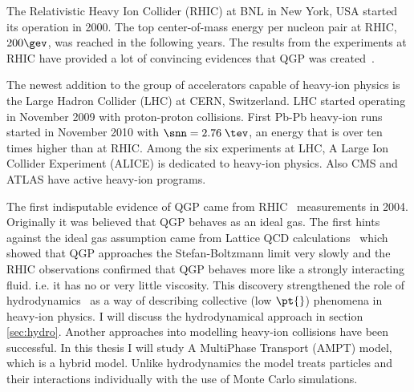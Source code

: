 The Relativistic Heavy Ion Collider (RHIC) at BNL in New York, USA started its  operation in 2000. The top center-of-mass energy per nucleon pair at RHIC, $200 \gev$, was reached in the following years. The results from the experiments at RHIC have provided a lot of convincing evidences that QGP was created~\cite{Adcox:2004mh, Adams:2005dq, Arsene:2004fa, Back:2004je}. 

The newest addition to the group of accelerators capable of heavy-ion physics is the Large Hadron Collider (LHC) at CERN, Switzerland. LHC started operating in November 2009 with proton-proton collisions. First Pb-Pb heavy-ion runs started in November 2010 with $\snn=2.76\; \tev$, an energy that is over ten times higher than at RHIC. Among the six experiments at LHC, A Large Ion Collider Experiment (ALICE) is dedicated to heavy-ion physics. Also CMS and ATLAS have active heavy-ion programs. 

The first indisputable evidence of QGP came from RHIC~\cite{Adcox:2004mh} measurements in 2004. Originally it was believed that QGP behaves as an ideal gas. The first hints against the ideal gas assumption came from Lattice QCD calculations~\cite{Karsch:2001cy} which showed that QGP approaches the Stefan-Boltzmann limit very slowly and the RHIC observations confirmed that QGP behaves more like a strongly interacting fluid. i.e. it has no or very little viscosity. This discovery strengthened the role of hydrodynamics~\cite{PhysRevD.27.140, Baym1983541, PhysRevD.34.794} as a way of describing collective (low $\pt{}$) phenomena in heavy-ion physics. I will discuss the hydrodynamical approach in section \ref{sec:hydro}. Another approaches into modelling heavy-ion collisions have been successful. In this thesis I will study A MultiPhase Transport (AMPT) model, which is a hybrid model. Unlike hydrodynamics the model treats particles and their interactions individually with the use of Monte Carlo simulations.






